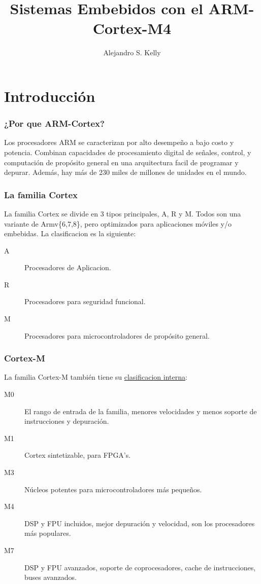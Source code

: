 \documentclass[11pt]{beamer}
\title{Sistemas Embebidos con el ARM-Cortex-M4}
\author[AK]{Alejandro S. Kelly}
\institute[]{Pulsar Labs}
\begin{document}
    \frame{\titlepage}

    \section{Introducción}

        \begin{frame}
            \frametitle{¿Por que ARM-Cortex?}

            Los procesadores ARM se caracterizan por alto desempeño a bajo costo y potencia. \hfill\break\break 
            Combinan capacidades de procesamiento digital de señales, control, y computación de propósito general en una arquitectura facil de programar y depurar. \hfill\break\break 
            Además, hay más de 230 miles de millones de unidades en el mundo. 
        \end{frame}

        \begin{frame}
            \frametitle{La familia Cortex}

            La familia Cortex se divide en 3 tipos principales, A, R y M. Todos son una variante de Armv\{6,7,8\}, pero optimizados para aplicaciones móviles y/o embebidas.
            La clasificacion es la siguiente: 
                
            \begin{description}
                \item[A] Procesadores de Aplicacion. 
                \item[R] Procesadores para seguridad funcional.
                \item[M] Procesadores para microcontroladores de propósito general. 
            \end{description}
        \end{frame}

        \begin{frame}
            \frametitle{Cortex-M}

            La familia Cortex-M también tiene su \href{run:./Resources/CORTEX_COMPARISON.pdf}{clasificacion interna}:
            
            \begin{description}
                \item[M0] El rango de entrada de la familia, menores velocidades y menos soporte de instrucciones y depuración. 
                \item[M1] Cortex sintetizable, para FPGA's.
                \item[M3] Núcleos potentes para microcontroladores más pequeños.
                \item[M4] DSP y FPU incluidos, mejor depuración y velocidad, son los procesadores más populares.
                \item[M7] DSP y FPU avanzados, soporte de coprocesadores, cache de instrucciones, buses avanzados.
            \end{description}
        \end{frame}
\end{document}
